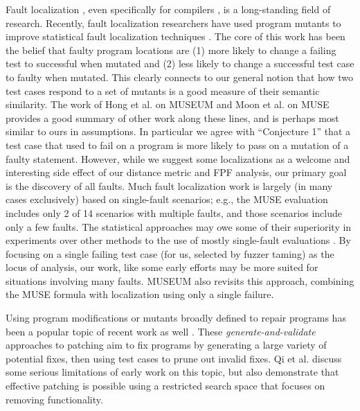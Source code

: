 Fault localization \cite{FaultSurvey,NearNeighbor,Liblit03,Liblit05,Cleve05,Jones2002,Jones05,Jones07,GroceError,ChakiLev,Liu06,SPIN03,Santelices:ICSE:2009,Abreu:2006:PRDC,xuan2014test,DD}, even specifically for compilers \cite{Whalley94}, is a long-standing field of research.  Recently, fault localization researchers have used program mutants to improve statistical \cite{Jones2002} fault localization techniques \cite{MUSE,DebroyMutant,FasterMutant,multilingual,Metallaxis,Papadakis}.
The core of this work has been the belief that faulty program locations are (1) more likely to change a failing test to successful when mutated and (2) less likely to change a successful test case to faulty when mutated.  This clearly connects to our general notion that how two test cases respond to a set of mutants is a good measure of their semantic similarity.
The work of Hong et al. \cite{multilingual} on MUSEUM and Moon et al. \cite{MUSE} on MUSE provides a good summary of other work along these lines, and is perhaps most similar to ours in assumptions. In particular we agree with ``Conjecture 1'' that a test case that used to fail on a program is more likely to pass on a mutation of a faulty statement.  However, while we suggest some localizations as a welcome and interesting side effect of our distance metric and FPF analysis, our primary goal is the discovery of all faults. Much fault localization work is largely (in many cases exclusively) based on single-fault scenarios; e.g., the MUSE \cite{MUSE} evaluation includes only 2 of 14 scenarios with multiple faults, and those scenarios include only a few faults.   The statistical approaches may owe some of their superiority in experiments over other methods to the use of mostly single-fault evaluations \cite{Jones05}.  By focusing on a single failing test case (for us, selected by fuzzer taming) as the locus of analysis, our work, like some early efforts \cite{NearNeighbor,Cleve05,GroceError} may be more suited for situations involving many faults.  MUSEUM \cite{multilingual} also revisits this approach, combining the MUSE formula with localization using only a single failure.

Using program modifications or mutants broadly defined to repair programs has been a popular topic of recent work as well \cite{GenProg,AutoRep,WeiFix}.  These \emph{generate-and-validate} approaches to patching aim to fix programs by generating a large variety of potential fixes, then using test cases to prune out invalid fixes.  Qi et al. \cite{achour} discuss some serious limitations of early work on this topic, but also demonstrate that effective patching is possible using a restricted search space that focuses on removing functionality.

